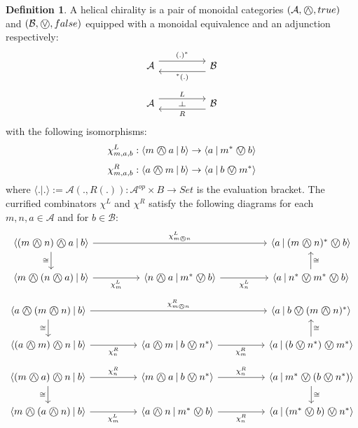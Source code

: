 \documentclass[8pt]{article}
\theoremstyle{definition}
\newtheorem{definition}{Definition}[section]
\theoremstyle{definition}
\theoremstyle{definition}
\theoremstyle{definition}
\theoremstyle{definition}
\theoremstyle{definition}
\theoremstyle{definition}
\theoremstyle{definition}
\theoremstyle{definition}
\theoremstyle{definition}
\theoremstyle{definition}
\theoremstyle{definition}
\theoremstyle{definition}
\theoremstyle{definition}
\theoremstyle{question}
\newcommand{\circvee}{\mathbin{\text{\ooalign{\hfil$\vee$\hfil\cr\kern0.1ex$\bigcirc$}}}}
\newcommand{\circwedge}{\mathbin{\text{\ooalign{\hfil$\wedge$\hfil\cr\kern0.1ex$\bigcirc$}}}}
\begin{document}
\begin{definition}
  A helical chirality is a pair of monoidal categories $(\mathcal{A}, \circwedge, true)$ and $(\mathcal{B}, \circvee, false)$
  equipped with a monoidal equivalence and an adjunction respectively:
  \[
  \begin{tikzcd}
  \mathcal{A} \ar[rr, shift left=1.25ex, "(.)^*", ""{name=Fl}] && \mathcal{B} \ar[ll, shift left=1.25ex, "{}^{*}(.)", ""{name=Fr}]
  \end{tikzcd}
  \]
  \[
  \begin{tikzcd}
  \mathcal{A} \ar[rr, shift left=1.25ex, "L", ""{name=Fl}] && \mathcal{B} \ar[ll, shift left=1.25ex, "R", ""{name=Fr}]
  \arrow[phantom, from=Fr, to=Fl, "\dashv" rotate=-90]
  \end{tikzcd}
  \]
  with the following isomorphisms:
  \[
  \chi^{L}_{m,a,b} : \langle m \circwedge a \: | \: b \rangle \to \langle a \: | \: m^* \circvee b \rangle
  \]
  \[
  \chi^{R}_{m,a,b} : \langle a \circwedge m \: | \: b \rangle \to \langle a \: | \: b \circvee m^* \rangle
  \]
  where $\langle . | . \rangle := \mathcal{A}(., R(.)) : \mathcal{A}^{op} \times B \to Set$ is the evaluation bracket.
  The currified combinators $\chi^{L}$ and $\chi^R$ satisfy the following diagrams for each $m, n, a \in \mathcal{A}$ and for $b \in \mathcal{B}$:
  \[
  \begin{tikzcd}
  \langle (m \circwedge n) \circwedge a \: | \: b \rangle \ar[d, "\cong"'] \ar[rrrr, "\chi^L_{m \circwedge n}"] &&&& \langle a \: | \: (m \circwedge n)^* \circvee b \rangle  \\
  \langle m \circwedge (n \circwedge a) \: | \: b \rangle \ar[rr, "\chi^L_m"'] && \langle n \circwedge a \: | \: m^* \circvee b \rangle \ar[rr, "\chi^L_n"'] && \langle a \: | \: n^* \circvee m^* \circvee b \rangle \ar[u, "\cong"']
  \end{tikzcd}
  \]
  \[
  \begin{tikzcd}
  \langle a \circwedge (m \circwedge n) \: | \: b \rangle \ar[d, "\cong"'] \ar[rrrr, "\chi^R_{m \circwedge n}"] &&&& \langle a \: | \: b \circvee (m \circwedge n)^* \rangle  \\
  \langle (a \circwedge m) \circwedge n \: | \: b \rangle \ar[rr, "\chi^R_n"'] && \langle a \circwedge m \: | \: b \circvee n^* \rangle \ar[rr, "\chi^R_m"'] && \langle a \: | \: (b \circvee n^*) \circvee m^* \rangle \ar[u, "\cong"']
  \end{tikzcd}
  \]
  \[
  \begin{tikzcd}
    \langle (m \circwedge a) \circwedge n \: | \: b \rangle \ar[d, "\cong"'] \ar[rr, "\chi^R_n"] && \langle m \circwedge a \: | \: b \circvee n^* \rangle  \ar[rr, "\chi^R_n"] && \langle a \: | \: m^* \circvee (b \circvee n^*) \rangle \ar[d, "\cong"] \\
    \langle m \circwedge (a \circwedge n) \: | \: b \rangle \ar[rr, "\chi^L_m"'] && \langle a \circwedge n \: | \: m^* \circvee b \rangle \ar[rr, "\chi^R_n"'] && \langle a \: | \: (m^* \circvee b) \circvee n^* \rangle \\
  \end{tikzcd}
  \]
\end{definition}
\end{document}
